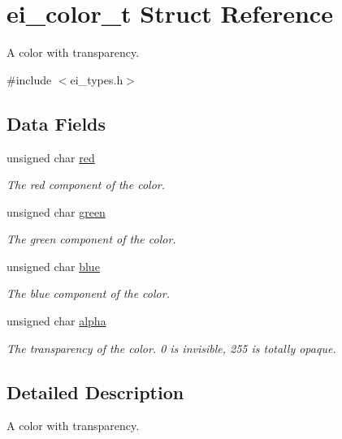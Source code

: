 \hypertarget{structei__color__t}{\section{ei\+\_\+color\+\_\+t Struct Reference}
\label{structei__color__t}
}


A color with transparency.  




{\ttfamily \#include $<$ei\+\_\+types.\+h$>$}

\subsection*{Data Fields}
\begin{DoxyCompactItemize}
\item 
unsigned char \hyperlink{structei__color__t_a9adf283c79176b3426ac63784f0bc17b}{red}
\begin{DoxyCompactList}\small\item\em The red component of the color. \end{DoxyCompactList}\item 
unsigned char \hyperlink{structei__color__t_ad85ce262fb9c76fe3c52b4eed19505d1}{green}
\begin{DoxyCompactList}\small\item\em The green component of the color. \end{DoxyCompactList}\item 
unsigned char \hyperlink{structei__color__t_af8d67b7a72cbb586519b55033350fb8c}{blue}
\begin{DoxyCompactList}\small\item\em The blue component of the color. \end{DoxyCompactList}\item 
unsigned char \hyperlink{structei__color__t_af213a14356db920b1a04f5270263ae61}{alpha}
\begin{DoxyCompactList}\small\item\em The transparency of the color. 0 is invisible, 255 is totally opaque. \end{DoxyCompactList}\end{DoxyCompactItemize}


\subsection{Detailed Description}
A color with transparency. 

